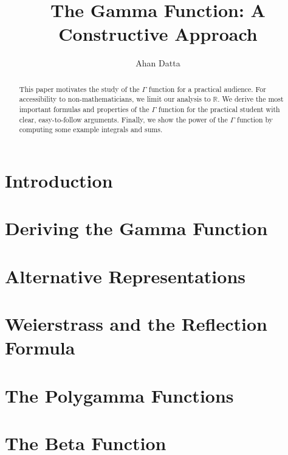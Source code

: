 \documentclass[openany, amssymb, psamsfonts]{amsart}
\title{The Gamma Function: A Constructive Approach}
\author{Ahan Datta}
\newcommand{\R}{\mathbb{R}}
\theoremstyle{definition}
\numberwithin{equation}{section}
\begin{document}
\begin{abstract}

This paper motivates the study of the $\Gamma$ function for a practical audience.
For accessibility to non-mathematicians, we limit our analysis to $\R$.
We derive the most important formulas and properties of the $\Gamma$ function for the practical student with clear, easy-to-follow arguments.
Finally, we show the power of the $\Gamma$ function by computing some example integrals and sums.

\end{abstract}

\maketitle

\tableofcontents

\section{Introduction}

    

\newpage
\section{Deriving the Gamma Function}

    

\newpage
\section{Alternative Representations}

    

\newpage
\section{Weierstrass and the Reflection Formula}

    

\newpage
\section{The Polygamma Functions}

    

\newpage
\section{The Beta Function}
\end{document}
